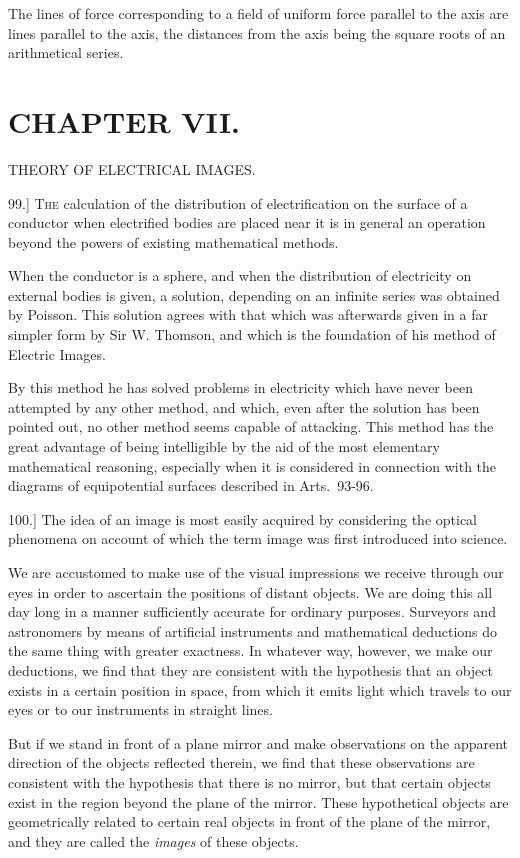 \documentclass[12pt,oneside]{book}[2021/10/04]
\newcommand{\Heading}{\centering\normalfont}
\newcommand{\Chapter}[1]{\section*{\large\Heading #1}}
\newcommand{\Runhead}[1]{\fancyhead[C]{\iffloatpage{}{\small#1}}}
\newcommand{\Subheading}[1]{\begin{center}\small #1 \end{center}}
\newcommand{\article}[1]{\phantomsection \label{art:#1}{#1.]}}
\newcommand{\¬}{\hphantom{0}}
\newcommand{\newchapter}{\newpage\thispagestyle{empty}}
\begin{document}
The lines of force corresponding to a field of uniform force parallel
to the axis are lines parallel to the axis, the distances from the
axis being the square roots of an arithmetical series.

\newchapter
\Chapter{CHAPTER VII.}
\Subheading{THEORY OF ELECTRICAL IMAGES.}
\Runhead{ELECTRICAL IMAGES.}

\article{99} \textsc{The} calculation of the distribution of electrification on the
surface of a conductor when electrified bodies are placed near it is in
general an operation beyond the powers of existing mathematical
methods.

When the conductor is a sphere, and when the distribution of
electricity on external bodies is given, a solution, depending on
an infinite series was obtained by Poisson. This solution agrees
with that which was afterwards given in a far simpler form by
Sir W. Thomson, and which is the foundation of his method of
Electric Images.

By this method he has solved problems in electricity which
have never been attempted by any other method, and which, even
after the solution has been pointed out, no other method seems
capable of attacking. This method has the great advantage of
being intelligible by the aid of the most elementary mathematical
reasoning, especially when it is considered in connection with the
diagrams of equipotential surfaces described in Arts.\ 93-96.

\article{100} The idea of an image is most easily acquired by considering
the optical phenomena on account of which the term image was
first introduced into science.

We are accustomed to make use of the visual impressions we
receive through our eyes in order to ascertain the positions of
distant objects. We are doing this all day long in a manner
sufficiently accurate for ordinary purposes. Surveyors and astronomers
by means of artificial instruments and mathematical deductions
do the same thing with greater exactness. In whatever
way, however, we make our deductions, we find that they are
consistent with the hypothesis that an object exists in a certain
position in space, from which it emits light which travels to our
eyes or to our instruments in straight lines.

But if we stand in front of a plane mirror and make observations
on the apparent direction of the objects reflected therein, we find
that these observations are consistent with the hypothesis that
there is no mirror, but that certain objects exist in the region
beyond the plane of the mirror. These hypothetical objects are
geometrically related to certain real objects in front of the plane of
the mirror, and they are called the \textit{images} of these objects.
\end{document}
